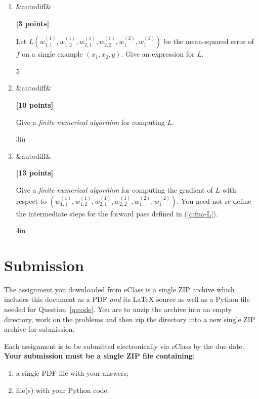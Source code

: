 \documentclass{article}
\newcounter{totalpoints}
\newcommand{\points}[2][]{{\addtocounter{totalpoints}{#2}\ifx&#1&\else\addtocounter{#1}{#2}\fi\textbf{[#2 points]}}}
\begin{document}
\begin{enumerate}
\begin{enumerate}
\begin{answer}{10\baselineskip}
\end{answer}

\item \points[autodiff]{3}
Let $L\left(w^{(1)}_{1,1}, w^{(1)}_{1,2}, w^{(1)}_{2,1}, w^{(1)}_{2,2}, w^{(2)}_1, w^{(2)}_1\right)$ be the mean-squared error of $f$ on a single example $(x_1,x_2,y)$.
Give an expression for $L$.
\begin{answer}{5\baselineskip}
\end{answer}

\item \points[autodiff]{10} \label{q:fna-L}
Give a \emph{finite numerical algorithm} for computing $L$.

\begin{answer}{3in}
\end{answer}

\item \points[autodiff]{13}
\newcommand{\loc}[1]{\overline{s_{#1}}}
\newcommand{\p}[2]{\frac{\partial s_{#1}}{\partial s_{#2}}}
\newcommand{\ind}{\mathds{1}}
Give a \emph{finite numerical algorithm} for computing the gradient of $L$ with respect to $\left(w^{(1)}_{1,1}, w^{(1)}_{1,2}, w^{(1)}_{2,1}, w^{(1)}_{2,2}, w^{(2)}_1, w^{(2)}_1\right)$.
You need not re-define the intermediate steps for the forward pass defined in (\ref{q:fna-L}).

\begin{answer}{4in}
\end{answer}
\end{enumerate}

\end{enumerate}


\clearpage

\section*{Submission}
The assignment you downloaded from eClass is a single ZIP archive which includes this document as a PDF {\em and} its \LaTeX{} source as well as a Python file needed for Question~\ref{q:code}.
You are to unzip the archive into an empty directory, work on the problems and then zip the directory into a new single ZIP archive for submission.

\medskip

Each assignment is to be submitted electronically via eClass by the due date.
\textbf{Your submission must be a single ZIP file containing}:
\begin{enumerate}
\item a single PDF file with your answers;
\item file(s) with your Python code.
\end{enumerate}
\end{document}
